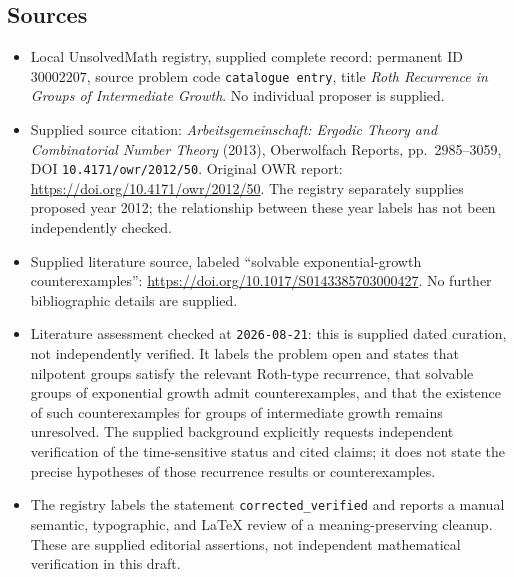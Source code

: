 \documentclass[11pt]{article}
\begin{document}
\subsection{Sources}
\begin{itemize}
\item Local UnsolvedMath registry, supplied complete record: permanent ID \(30002207\), source problem code \texttt{catalogue entry}, title \emph{Roth Recurrence in Groups of Intermediate Growth}. No individual proposer is supplied.
\item Supplied source citation: \emph{Arbeitsgemeinschaft: Ergodic Theory and Combinatorial Number Theory} (2013), Oberwolfach Reports, pp.\ 2985--3059, DOI \texttt{10.4171/owr/2012/50}. Original OWR report: \url{https://doi.org/10.4171/owr/2012/50}. The registry separately supplies proposed year 2012; the relationship between these year labels has not been independently checked.
\item Supplied literature source, labeled ``solvable exponential-growth counterexamples'': \url{https://doi.org/10.1017/S0143385703000427}. No further bibliographic details are supplied.
\item Literature assessment checked at \texttt{2026-08-21}: this is supplied dated curation, not independently verified. It labels the problem open and states that nilpotent groups satisfy the relevant Roth-type recurrence, that solvable groups of exponential growth admit counterexamples, and that the existence of such counterexamples for groups of intermediate growth remains unresolved. The supplied background explicitly requests independent verification of the time-sensitive status and cited claims; it does not state the precise hypotheses of those recurrence results or counterexamples.
\item The registry labels the statement \texttt{corrected\_verified} and reports a manual semantic, typographic, and LaTeX review of a meaning-preserving cleanup. These are supplied editorial assertions, not independent mathematical verification in this draft.
\end{itemize}
\end{document}
